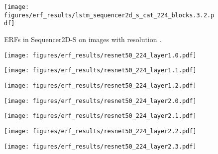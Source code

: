 \documentclass{article}
\begin{document}
\begin{figure}[tb]
\begin{minipage}[t]{0.13\hsize}
    \label{figure:erf_sequencer:16}
  \end{minipage}
  \begin{minipage}[t]{0.13\hsize}
    \centering
    \texttt{[image: figures/erf\_results/lstm\_sequencer2d\_s\_cat\_224\_blocks.3.2.pdf]}
    \label{figure:erf_sequencer:17}
  \end{minipage}
  \caption{ERFs in Sequencer2D-S on images with resolution .}
    \label{figure:erf_sequencer}
\end{figure} \begin{figure}[tb]
  \raggedright
  \begin{minipage}[t]{0.13\hsize}
    \centering
    \texttt{[image: figures/erf\_results/resnet50\_224\_layer1.0.pdf]}
    \label{figure:erf_resnet:0}
  \end{minipage}
  \begin{minipage}[t]{0.13\hsize}
    \centering
    \texttt{[image: figures/erf\_results/resnet50\_224\_layer1.1.pdf]}
    \label{figure:erf_resnet:1}
  \end{minipage}
  \begin{minipage}[t]{0.13\hsize}
    \centering
    \texttt{[image: figures/erf\_results/resnet50\_224\_layer1.2.pdf]}
    \label{figure:erf_resnet:2}
  \end{minipage}
  \begin{minipage}[t]{0.13\hsize}
    \centering
    \texttt{[image: figures/erf\_results/resnet50\_224\_layer2.0.pdf]}
    \label{figure:erf_resnet:3}
  \end{minipage}
  \begin{minipage}[t]{0.13\hsize}
    \centering
    \texttt{[image: figures/erf\_results/resnet50\_224\_layer2.1.pdf]}
    \label{figure:erf_resnet:4}
  \end{minipage}
  \begin{minipage}[t]{0.13\hsize}
    \centering
    \texttt{[image: figures/erf\_results/resnet50\_224\_layer2.2.pdf]}
    \label{figure:erf_resnet:5}
  \end{minipage}
  \begin{minipage}[t]{0.13\hsize}
    \centering
    \texttt{[image: figures/erf\_results/resnet50\_224\_layer2.3.pdf]}
    \label{figure:erf_resnet:6}
  \end{minipage}

\end{figure}
\end{document}

